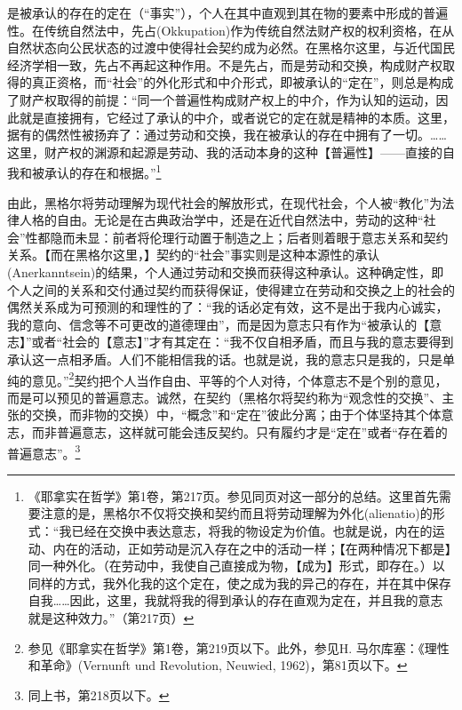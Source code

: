 是被承认的存在的定在（“事实”），个人在其中直观到其在物的要素中形成的普遍性。在传统自然法中，先占(Okkupation)作为传统自然法财产权的权利资格，在从自然状态向公民状态的过渡中使得社会契约成为必然。在黑格尔这里，与近代国民经济学相一致，先占不再起这种作用。不是先占，而是劳动和交换，构成财产权取得的真正资格，而“社会”的外化形式和中介形式，即被承认的“定在”，则总是构成了财产权取得的前提：“同一个普遍性构成财产权上的中介，作为认知的运动，因此就是直接拥有，它经过了承认的中介，或者说它的定在就是精神的本质。这里，据有的偶然性被扬弃了：通过劳动和交换，我在被承认的存在中拥有了一切。……这里，财产权的渊源和起源是劳动、我的活动本身的这种【普遍性】——直接的自我和被承认的存在和根据。”\footnote{《耶拿实在哲学》第1卷，第217页。参见同页对这一部分的总结。这里首先需要注意的是，黑格尔不仅将交换和契约而且将劳动理解为外化(alienatio)的形式：“我已经在交换中表达意志，将我的物设定为价值。也就是说，内在的运动、内在的活动，正如劳动是沉入存在之中的活动一样；【在两种情况下都是】同一种外化。（在劳动中，我使自己直接成为物，【成为】形式，即存在。）以同样的方式，我外化我的这个定在，使之成为我的异己的存在，并在其中保存自我……因此，这里，我就将我的得到承认的存在直观为定在，并且我的意志就是这种效力。”（第217页）}

由此，黑格尔将劳动理解为现代社会的解放形式，在现代社会，个人被“教化”为法律人格的自由。无论是在古典政治学中，还是在近代自然法中，劳动的这种“社会”性都隐而未显：前者将伦理行动置于制造之上；后者则着眼于意志关系和契约关系。【而在黑格尔这里，】契约的“社会”事实则是这种本源性的承认(Anerkanntsein)的结果，个人通过劳动和交换而获得这种承认。这种确定性，即个人之间的关系和交付通过契约而获得保证，使得建立在劳动和交换之上的社会的偶然关系成为可预测的和理性的了：“我的话必定有效，这不是出于我内心诚实，我的意向、信念等不可更改的道德理由”，而是因为意志只有作为“被承认的【意志】”或者“社会的【意志】”才有其定在：“我不仅自相矛盾，而且与我的意志要得到承认这一点相矛盾。人们不能相信我的话。也就是说，我的意志只是我的，只是单纯的意见。”\footnote{参见《耶拿实在哲学》第1卷，第219页以下。此外，参见H. 马尔库塞：《理性和革命》(Vernunft und Revolution, Neuwied, 1962)，第81页以下。}契约把个人当作自由、平等的个人对待，个体意志不是个别的意见，而是可以预见的普遍意志。诚然，在契约（黑格尔将契约称为“观念性的交换”、主张的交换，而非物的交换）中，“概念”和“定在”彼此分离；由于个体坚持其个体意志，而非普遍意志，这样就可能会违反契约。只有履约才是“定在”或者“存在着的普遍意志”。\footnote{同上书，第218页以下。}

